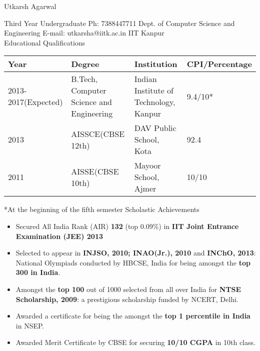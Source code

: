 \documentclass{article}
\begin{document}
\sffamily
\begin{flushleft}
{\Huge{Utkarsh Agarwal}}
\end{flushleft}
\vspace{0.5cm}
{\small Third Year Undergraduate \hspace{11.5cm} Ph: 7388447711\newline
       Dept. of Computer Science and Engineering \hspace{9.05cm} E-mail: utkarsha@iitk.ac.in\newline
       IIT Kanpur\newline
}
\\
\hspace{-2cm}
{\Large Educational Qualifications}
\newline
\newline
\begin{tabular}{| l | l | l |l|}
\hline
Year         & Degree & Institution & CPI/Percentage\\ \hline
2013-2017(Expected) & B.Tech, Computer Science and Engineering & Indian Institute of Technology, Kanpur & 9.4/10*\\ \hline
2013 & AISSCE(CBSE 12th) & DAV Public School, Kota & 92.4 \\ \hline
2011 & AISSE(CBSE 10th) & Mayoor School, Ajmer & 10/10\\ \hline
\end{tabular}
*At the beginning of the fifth semester \newline\newline\newline
{\Large Scholastic Achievements}
	\begin{itemize}
\item Secured All India Rank (AIR) \textbf {132} (top 0.09\%) in \textbf {IIT Joint Entrance Examination (JEE) 2013} 
\item Selected to appear in \textbf{INJSO, 2010; INAO(Jr.), 2010} and \textbf{INChO, 2013}: National Olympiads conducted by HBCSE, India for being amongst the \textbf{top 300 in India}.
\item Amongst the \textbf{top 100} out of 1000 selected from all over India for \textbf{NTSE Scholarship, 2009}: a prestigious scholarship funded by NCERT, Delhi.
\item Awarded a certificate for being the amongst the \textbf{top 1 percentile in India} in  NSEP.
\item Awarded Merit Certificate by CBSE for securing \textbf{10/10 CGPA} in 10th class.
	\end{itemize}
\end{document}

